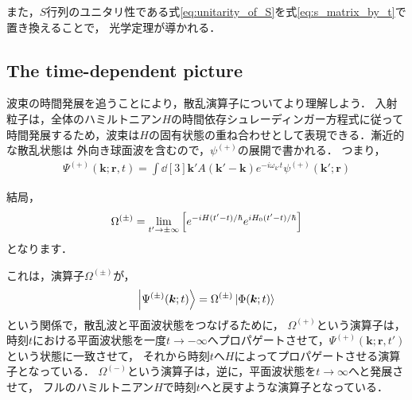 \documentclass[a4paper,11pt]{ltjsarticle}
\numberwithin{equation}{section}
\begin{document}
また，$S$行列のユニタリ性である式\ref{eq:unitarity_of_S}を式\ref{eq:s_matrix_by_t}で置き換えることで，
光学定理が導かれる．


\subsection{The time-dependent picture}

波束の時間発展を追うことにより，散乱演算子についてより理解しよう．
入射粒子は，全体のハミルトニアン$H$の時間依存シュレーディンガー方程式に従って
時間発展するため，波束は$H$の固有状態の重ね合わせとして表現できる．漸近的な散乱状態は
外向き球面波を含むので，$\psi^{(+)}$の展開で書かれる．
つまり，
\begin{align}
  \Psi^{(+)}(\bm{k}; \bm{r}, t) = \int \dd[3]{\bm{k}'} A(\bm{k}' - \bm{k}) e^{-i\omega_{k'} t} \psi^{(+)} (\bm{k}'; \bm{r}) 
\end{align}

結局，
\begin{align}\label{eq:moller_op_t_dep}
  \Omega^{(\pm)} = \lim_{t' \rightarrow \pm \infty} \qty[e^{-iH(t'-t)/\hbar} e^{iH_0(t'-t)/\hbar}] 
\end{align}
となります．

これは，演算子$\Omega^{(\pm)}$が，
\begin{align} 
  \ket{\Psi^{(\pm)}(\bm{k};t)} = \Omega^{(\pm)} \ket{\Phi(\bm{k}; t)}
\end{align}
という関係で，散乱波と平面波状態をつなげるために，
$\Omega^{(+)}$という演算子は，
時刻$t$における平面波状態を一度$t \rightarrow -\infty$へプロパゲートさせて，$\Psi^{(+)}(\bm{k}; \bm{r}, t')$という状態に一致させて，
それから時刻$t$へ$H$によってプロパゲートさせる演算子となっている．
$\Omega^{(-)}$という演算子は，逆に，平面波状態を$t \rightarrow \infty$へと発展させて，
フルのハミルトニアン$H$で時刻$t$へと戻すような演算子となっている．
\end{document}
